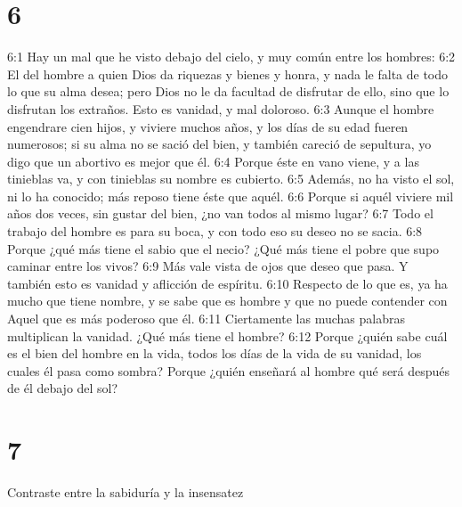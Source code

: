 \chapter{6}


6:1 Hay un mal que he visto debajo del cielo, y muy común entre los hombres:  
6:2 El del hombre a quien Dios da riquezas y bienes y honra, y nada le falta de todo lo que su alma desea; pero Dios no le da facultad de disfrutar de ello, sino que lo disfrutan los extraños. Esto es vanidad, y mal doloroso.  
6:3 Aunque el hombre engendrare cien hijos, y viviere muchos años, y los días de su edad fueren numerosos; si su alma no se sació del bien, y también careció de sepultura, yo digo que un abortivo es mejor que él.  
6:4 Porque éste en vano viene, y a las tinieblas va, y con tinieblas su nombre es cubierto.  
6:5 Además, no ha visto el sol, ni lo ha conocido; más reposo tiene éste que aquél.  
6:6 Porque si aquél viviere mil años dos veces, sin gustar del bien, ¿no van todos al mismo lugar?  
6:7 Todo el trabajo del hombre es para su boca, y con todo eso su deseo no se sacia.  
6:8 Porque ¿qué más tiene el sabio que el necio? ¿Qué más tiene el pobre que supo caminar entre los vivos?  
6:9 Más vale vista de ojos que deseo que pasa. Y también esto es vanidad y aflicción de espíritu.  
6:10 Respecto de lo que es, ya ha mucho que tiene nombre, y se sabe que es hombre y que no puede contender con Aquel que es más poderoso que él.  
6:11 Ciertamente las muchas palabras multiplican la vanidad. ¿Qué más tiene el hombre?  
6:12 Porque ¿quién sabe cuál es el bien del hombre en la vida, todos los días de la vida de su vanidad, los cuales él pasa como sombra? Porque ¿quién enseñará al hombre qué será después de él debajo del sol?  

\chapter{7}

Contraste entre la sabiduría y la insensatez  

